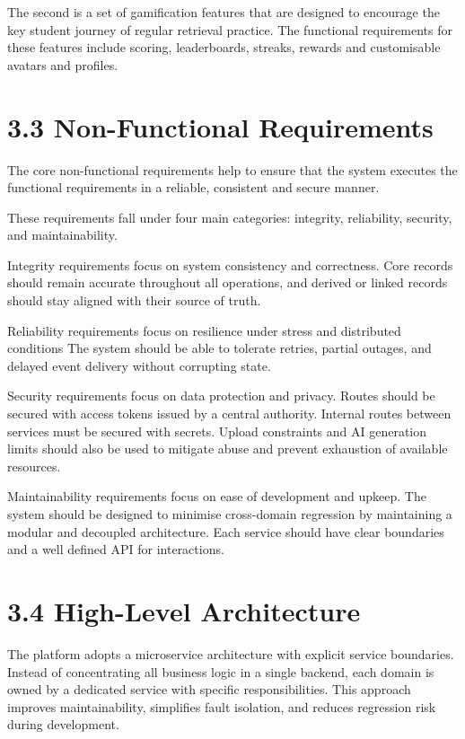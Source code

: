 \documentclass[
  12pt,
  a4paper,
]{report}
\begin{document}
The second is a set of gamification features that are designed to encourage the
key student journey of regular retrieval practice. The functional requirements
for these features include scoring, leaderboards, streaks, rewards and customisable
avatars and profiles.

\hypertarget{non-functional-requirements}{%
\section{3.3 Non-Functional
Requirements}\label{non-functional-requirements}}

The core non-functional requirements help to ensure that the system executes
the functional requirements in a reliable, consistent and secure manner.

These requirements fall under four main categories: integrity,
reliability, security, and maintainability.

Integrity requirements focus on system consistency and correctness.
Core records should remain accurate throughout all operations,
and derived or linked records should stay
aligned with their source of truth.

Reliability requirements focus on resilience under stress and
distributed conditions The system should be able to tolerate retries,
partial outages, and delayed event delivery without corrupting state.

Security requirements focus on data protection and privacy.
Routes should be secured with access tokens issued by a central
authority. Internal routes between services must be secured with
secrets. Upload constraints and AI generation limits should also be used
to mitigate abuse and prevent exhaustion of available resources.

Maintainability requirements focus on ease of development and upkeep.
The system should be designed to minimise cross-domain regression by
maintaining a modular and decoupled architecture.  Each service should
have clear boundaries and a well defined API for interactions.

\hypertarget{high-level-architecture}{%
\section{3.4 High-Level Architecture}\label{high-level-architecture}}

The platform adopts a microservice architecture with explicit service
boundaries. Instead of concentrating all
business logic in a single backend, each domain is owned by a dedicated
service with specific responsibilities. This approach improves
maintainability, simplifies fault isolation, and reduces regression risk
during development.
\end{document}
